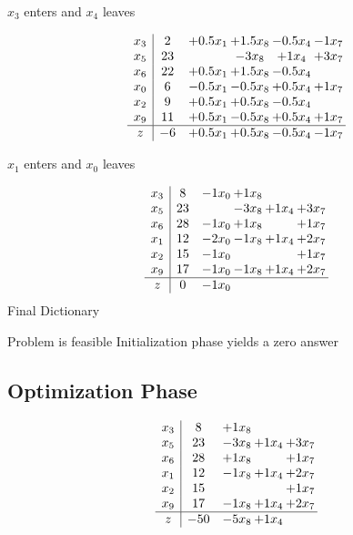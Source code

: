 \documentclass[12pt]{article}
\begin{document}
 $ x_{3} $ enters and $ x_{4} $ leaves 

 \[\begin{array}{c| c c@{\hskip 2pt} c@{\hskip 2pt} c@{\hskip 2pt} c@{\hskip 2pt} }
 x_{3}   &  2 & + 0.5 x_{1} & + 1.5 x_{8} & -0.5 x_{4} & -1 x_{7}\\
 x_{5}   &  23  &   & -3 x_{8} & + 1 x_{4} & + 3 x_{7}\\
 x_{6}   &  22 & + 0.5 x_{1} & + 1.5 x_{8} & -0.5 x_{4} &   \\
 x_{0}   &  6 & -0.5 x_{1} & -0.5 x_{8} & + 0.5 x_{4} & + 1 x_{7}\\
 x_{2}   &  9 & + 0.5 x_{1} & + 0.5 x_{8} & -0.5 x_{4} &   \\
 x_{9}   &  11 & + 0.5 x_{1} & -0.5 x_{8} & + 0.5 x_{4} & + 1 x_{7}\\
\hline
z    &  -6 & + 0.5 x_{1} & + 0.5 x_{8} & -0.5 x_{4} & -1 x_{7}\\
\end{array}\]


 $ x_{1} $ enters and $ x_{0} $ leaves 

 \[\begin{array}{c| c c@{\hskip 2pt} c@{\hskip 2pt} c@{\hskip 2pt} c@{\hskip 2pt} }
 x_{3}   &  8 & -1 x_{0} & + 1 x_{8} &    &   \\
 x_{5}   &  23  &   & -3 x_{8} & + 1 x_{4} & + 3 x_{7}\\
 x_{6}   &  28 & -1 x_{0} & + 1 x_{8} &   & + 1 x_{7}\\
 x_{1}   &  12 & -2 x_{0} & -1 x_{8} & + 1 x_{4} & + 2 x_{7}\\
 x_{2}   &  15 & -1 x_{0} &    &   & + 1 x_{7}\\
 x_{9}   &  17 & -1 x_{0} & -1 x_{8} & + 1 x_{4} & + 2 x_{7}\\
\hline
z    &  0 & -1 x_{0} &    &    &   \\
\end{array}\]
Final Dictionary

Problem is feasible Initialization phase yields a zero answer 

\subsection{Optimization Phase}
\[\begin{array}{c| c c@{\hskip 2pt} c@{\hskip 2pt} c@{\hskip 2pt} }
 x_{3}   &  8 & + 1 x_{8} &    &   \\
 x_{5}   &  23 & -3 x_{8} & + 1 x_{4} & + 3 x_{7}\\
 x_{6}   &  28 & + 1 x_{8} &   & + 1 x_{7}\\
 x_{1}   &  12 & -1 x_{8} & + 1 x_{4} & + 2 x_{7}\\
 x_{2}   &  15  &    &   & + 1 x_{7}\\
 x_{9}   &  17 & -1 x_{8} & + 1 x_{4} & + 2 x_{7}\\
\hline
z    &  -50 & -5 x_{8} & + 1 x_{4} &   \\
\end{array}\]
\end{document}
